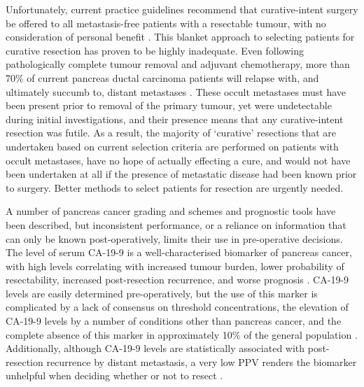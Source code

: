 \documentclass[dissertation.tex]{subfiles}
\begin{document}
Unfortunately, current practice guidelines recommend that curative-intent surgery be offered to all metastasis-free patients with a resectable tumour, with no consideration of personal benefit \cite{Editors2015}.  This blanket approach to selecting patients for curative resection has proven to be highly inadequate.  Even following pathologically complete tumour removal and adjuvant chemotherapy, more than 70\% of current pancreas ductal carcinoma patients will relapse with, and ultimately succumb to, distant metastases \cite{Barugola2007}.  These occult metastases must have been present prior to removal of the primary tumour, yet were undetectable during initial investigations, and their presence means that any curative-intent resection was futile.  As a result, the majority of `curative' resections that are undertaken based on current selection criteria are performed on patients with occult metastases, have no hope of actually effecting a cure, and would not have been undertaken at all if the presence of metastatic disease had been known prior to surgery.  Better methods to select patients for resection are urgently needed.


A number of pancreas cancer grading and schemes and prognostic tools have been described, but inconsistent performance, or a reliance on information that can only be known post-operatively, limits their use in pre-operative decisions.  The level of serum \gls{CA-19-9} is a well-characterised biomarker of pancreas cancer, with high levels correlating with increased tumour burden, lower probability of resectability, increased post-resection recurrence, and worse prognosis \cite{Kim2011, Ballehaninna2012, Barugola2007, Lundin1994}.  \Gls{CA-19-9} levels are easily determined pre-operatively, but the use of this marker is complicated by a lack of consensus on threshold concentrations, the elevation of \gls{CA-19-9} levels by a number of conditions other than pancreas cancer, and the complete absence of this marker in approximately 10\% of the general population \cite{Ballehaninna2012}.  Additionally, although \gls{CA-19-9} levels are statistically associated with post-resection recurrence by distant metastasis, a very low \gls{PPV} renders the biomarker unhelpful when deciding whether or not to resect \cite{Kim2011}.
\end{document}
